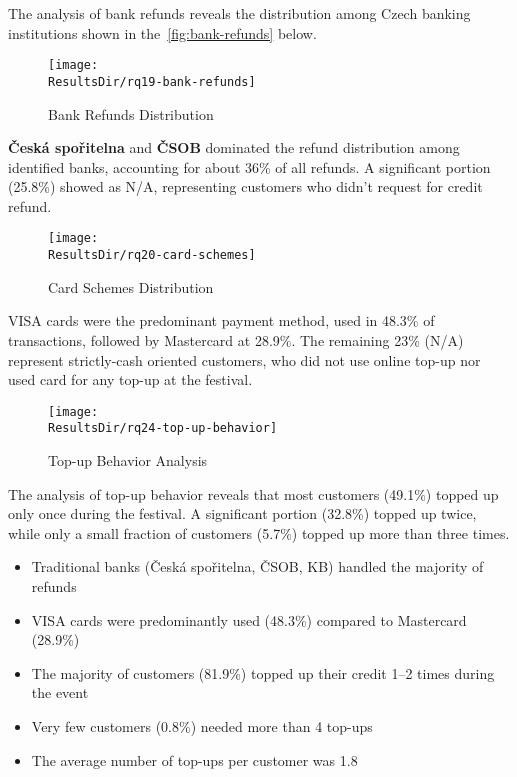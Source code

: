 
The analysis of bank refunds reveals the distribution among Czech banking institutions shown in the~\autoref{fig:bank-refunds} below.

\begin{figure}[H]
	\centering
	\texttt{[image: \\ResultsDir/rq19-bank-refunds]}
	\caption{Bank Refunds Distribution}
	\label{fig:bank-refunds}
	\source
\end{figure}

\textbf{Česká spořitelna} and \textbf{ČSOB} dominated the refund distribution among identified banks, accounting for about 36\% of all refunds.
A significant portion (25.8\%) showed as N/A, representing customers who didn't request for credit refund.


\begin{figure}[H]
	\centering
	\texttt{[image: \\ResultsDir/rq20-card-schemes]}
	\caption{Card Schemes Distribution}
	\label{fig:card-schemes}
	\source
\end{figure}

VISA cards were the predominant payment method, used in 48.3\% of transactions, followed by Mastercard at 28.9\%.
The remaining 23\% (N/A) represent strictly-cash oriented customers, who did not use online top-up nor used card for any top-up at the festival.


\begin{figure}[H]
	\centering
	\texttt{[image: \\ResultsDir/rq24-top-up-behavior]}
	\caption{Top-up Behavior Analysis}
	\label{fig:top-up-behavior}
	\source
\end{figure}

The analysis of top-up behavior reveals that most customers (49.1\%) topped up only once during the festival.
A significant portion (32.8\%) topped up twice, while only a small fraction of customers (5.7\%) topped up more than three times.

\begin{keytakeaways}
	\begin{itemize}
		\item Traditional banks (Česká spořitelna, ČSOB, KB) handled the majority of refunds
		\item VISA cards were predominantly used (48.3\%) compared to Mastercard (28.9\%)
		\item The majority of customers (81.9\%) topped up their credit 1–2 times during the event
		\item Very few customers (0.8\%) needed more than 4 top-ups
		\item The average number of top-ups per customer was 1.8
	\end{itemize}
\end{keytakeaways}

